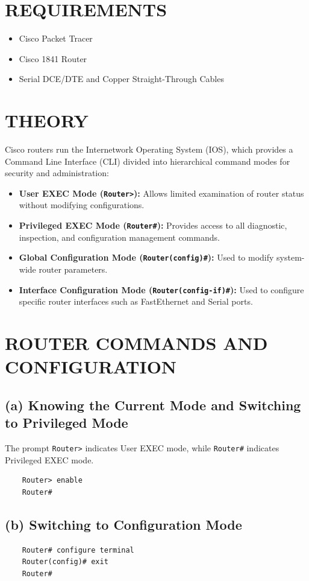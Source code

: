 \documentclass[12pt,a4paper]{article}
\begin{document}
\section*{REQUIREMENTS}
\begin{itemize}
	\item Cisco Packet Tracer
	\item Cisco 1841 Router
	\item Serial DCE/DTE and Copper Straight-Through Cables
\end{itemize}

\section*{THEORY}
Cisco routers run the Internetwork Operating System (IOS), which provides a Command Line Interface (CLI) divided into hierarchical command modes for security and administration:
\begin{itemize}
	\item \textbf{User EXEC Mode (\texttt{Router>}):} Allows limited examination of router status without modifying configurations.
	\item \textbf{Privileged EXEC Mode (\texttt{Router\#}):} Provides access to all diagnostic, inspection, and configuration management commands.
	\item \textbf{Global Configuration Mode (\texttt{Router(config)\#}):} Used to modify system-wide router parameters.
	\item \textbf{Interface Configuration Mode (\texttt{Router(config-if)\#}):} Used to configure specific router interfaces such as FastEthernet and Serial ports.
\end{itemize}

\section*{ROUTER COMMANDS AND CONFIGURATION}

\subsection*{(a) Knowing the Current Mode and Switching to Privileged Mode}
The prompt \texttt{Router>} indicates User EXEC mode, while \texttt{Router\#} indicates Privileged EXEC mode.
\begin{lstlisting}
	Router> enable
	Router#
\end{lstlisting}

\subsection*{(b) Switching to Configuration Mode}
\begin{lstlisting}
	Router# configure terminal
	Router(config)# exit
	Router#
\end{lstlisting}
\end{document}

